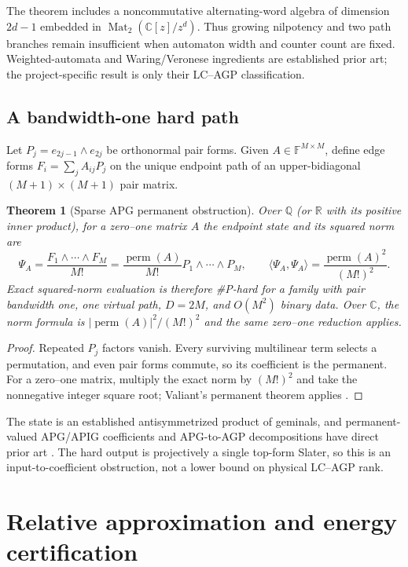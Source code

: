 \documentclass[11pt]{article}
\newtheorem{theorem}{Theorem}[section]
\theoremstyle{definition}
\newcommand{\Mat}{\operatorname{Mat}}
\newcommand{\perm}{\operatorname{perm}}
\begin{document}
The theorem includes a noncommutative alternating-word algebra of dimension
$2d-1$ embedded in $\Mat_2(\mathbb C[z]/z^d)$.  Thus growing nilpotency and two
path branches remain insufficient when automaton width and counter count are
fixed.  Weighted-automata and Waring/Veronese ingredients are established
prior art; the project-specific result is only their LC--AGP classification.

\subsection{A bandwidth-one hard path}

Let $P_j=e_{2j-1}\wedge e_{2j}$ be orthonormal pair forms.  Given
$A\in\mathbb F^{M\times M}$, define edge forms
$F_i=\sum_jA_{ij}P_j$ on the unique endpoint path of an upper-bidiagonal
$(M+1)\times(M+1)$ pair matrix.

\begin{theorem}[Sparse APG permanent obstruction]
Over $\mathbb Q$ (or $\mathbb R$ with its positive inner product), for a
zero--one matrix $A$ the endpoint state and its squared norm are
\[
 \Psi_A=\frac{F_1\wedge\cdots\wedge F_M}{M!}
 =\frac{\perm(A)}{M!}P_1\wedge\cdots\wedge P_M,
 \qquad
 \langle\Psi_A,\Psi_A\rangle=\frac{\perm(A)^2}{(M!)^2}.
\]
Exact squared-norm evaluation is therefore \#P-hard for a family with pair
bandwidth one, one virtual path, $D=2M$, and $O(M^2)$ binary data.  Over
$\mathbb C$, the norm formula is $|\perm(A)|^2/(M!)^2$ and the same zero--one
reduction applies.
\end{theorem}

\begin{proof}
Repeated $P_j$ factors vanish.  Every surviving multilinear term selects a
permutation, and even pair forms commute, so its coefficient is the permanent.
For a zero--one matrix, multiply the exact norm by $(M!)^2$ and take the
nonnegative integer square root; Valiant's permanent theorem applies
\cite{Valiant1979Permanent}.
\end{proof}

The state is an established antisymmetrized product of geminals, and permanent-
valued APG/APIG coefficients and APG-to-AGP decompositions have direct prior
art \cite{KawasakiNakatani2024LowRankAPG,
RicherKimAyers2025GraphicalGeminals}.  The hard output is projectively a single
top-form Slater, so this is an input-to-coefficient obstruction, not a lower
bound on physical LC--AGP rank.

\section{Relative approximation and energy certification}
\end{document}
